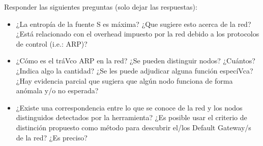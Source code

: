 Responder las siguientes preguntas (solo dejar las respuestas):

\begin{itemize}
	\item ¿La entropía de la fuente S es máxima? ¿Que sugiere esto acerca de la red? ¿Está relacionado con el overhead impuesto por la red debido a los protocolos de control (i.e.: ARP)?
	\item ¿Cómo es el tráVco ARP en la red? ¿Se pueden distinguir nodos? ¿Cuántos? ¿Indica algo la cantidad? ¿Se les puede adjudicar alguna función especíVca? ¿Hay evidencia parcial que sugiera que algún nodo funciona de forma anómala y/o no esperada?
	\item ¿Existe una correspondencia entre lo que se conoce de la red y los nodos distinguidos detectados por la herramienta? ¿Es posible usar el criterio de distinción propuesto como método para descubrir el/los Default Gateway/s de la red? ¿Es preciso?
\end{itemize}
